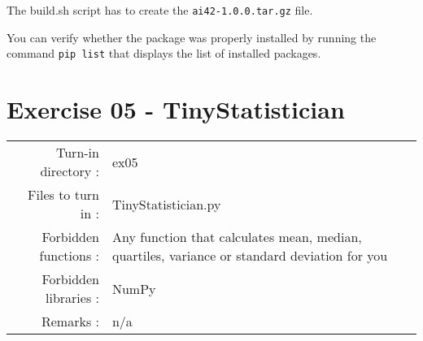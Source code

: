 \documentclass[]{article}
\begin{document}
The build.sh script has to create the \texttt{ai42-1.0.0.tar.gz} file.

You can verify whether the package was properly installed by running the
command \texttt{pip\ list} that displays the list of installed packages.

\clearpage

\hypertarget{exercise-05---tinystatistician-1}{%
\section{Exercise 05 -
TinyStatistician}\label{exercise-05---tinystatistician-1}}

\begin{longtable}[]{@{}rl@{}}
\toprule
\endhead
\begin{minipage}[t]{0.54\columnwidth}\raggedleft
Turn-in directory :\strut
\end{minipage} & \begin{minipage}[t]{0.40\columnwidth}\raggedright
ex05\strut
\end{minipage}\tabularnewline
\begin{minipage}[t]{0.54\columnwidth}\raggedleft
Files to turn in :\strut
\end{minipage} & \begin{minipage}[t]{0.40\columnwidth}\raggedright
TinyStatistician.py\strut
\end{minipage}\tabularnewline
\begin{minipage}[t]{0.54\columnwidth}\raggedleft
Forbidden functions :\strut
\end{minipage} & \begin{minipage}[t]{0.40\columnwidth}\raggedright
Any function that calculates mean, median, quartiles, variance or
standard deviation for you\strut
\end{minipage}\tabularnewline
\begin{minipage}[t]{0.54\columnwidth}\raggedleft
Forbidden libraries :\strut
\end{minipage} & \begin{minipage}[t]{0.40\columnwidth}\raggedright
NumPy\strut
\end{minipage}\tabularnewline
\begin{minipage}[t]{0.54\columnwidth}\raggedleft
Remarks :\strut
\end{minipage} & \begin{minipage}[t]{0.40\columnwidth}\raggedright
n/a\strut
\end{minipage}\tabularnewline
\bottomrule
\end{longtable}
\end{document}
